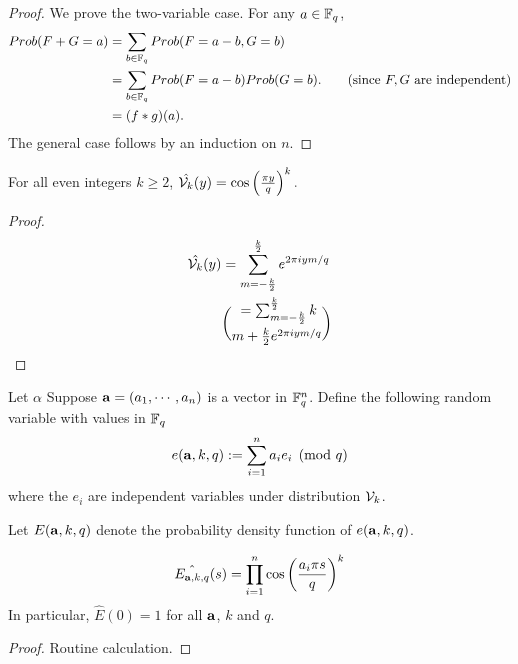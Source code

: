 \documentclass{amsart}
\begin{document}
\begin{proof}
We prove the two-variable case. For any $a \in \mathbb{F}_q$,
\begin{align*}
Prob(F+G = a) &= \sum_{b \in \mathbb{F}_q} Prob(F = a-b, G =b) \\
& = \sum_{b \in \mathbb{F}_q} Prob(F = a-b)Prob(G =b).  \qquad \mbox{(since $F,G$ are independent)} \\
& = (f \ast g)(a).
\end{align*}
The general case follows by an induction on $n$.
\end{proof}


\begin{Lemma}
For all even integers $k \geq 2$, $\hat{\mathcal{V}_k}(y)  = \cos \left(\frac{\pi y}{q}\right)^k.$
\end{Lemma}

\begin{proof}
\begin{align*}
\hat{\mathcal{V}_k}(y) &= \sum_{m = -\frac{k}{2}}^{\frac{k}{2}}  e^{2\pi i ym/q} \\
& = \sum_{m = -\frac{k}{2}}^{\frac{k}{2}} {k}\choose{m+\frac{k}{2}} e^{2\pi i ym/q}
\end{align*}
\end{proof}



\begin{Definition}
Let $\alpha $
Suppose ${\bf a} = (a_1, \cdots ,a_n)$ is a vector in $\mathbb{F}_q^n$. Define the following random variable with values in $\mathbb{F}_q$
\[
    e({\bf a}, k, q) := \sum_{i=1}^n a_i e_i \pmod {q}
\]
where the $e_i$ are independent variables under distribution $\mathcal{V}_k$.
\end{Definition}

Let $E({\bf a}, k, q)$ denote the probability density function of $e({\bf a}, k, q)$.


\begin{Lemma}
\[
    \hat{E_{{\bf a}, k, q}}(s) = \prod_{i=1}^{n} \cos \left(\frac{ a_i \pi s}{q} \right)^k
\]
In particular, $\hat{E}(0) = 1$ for all ${\bf a}$, $k$ and $q$.
\end{Lemma}

\begin{proof}
Routine calculation.
\end{proof}





\end{document}
